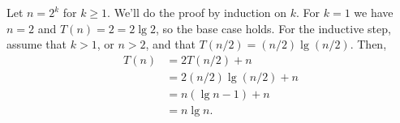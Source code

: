 Let $n=2^k$ for $k\ge1$.
We'll do the proof by induction on $k$.
For $k=1$ we have $n=2$ and $T(n)=2=2\lg2$, so the base case holds.
For the inductive step, assume that $k>1$, or $n>2$, and that $T(n/2)=(n/2)\lg(n/2)$.
Then,
\begin{align*}
    T(n) &= 2T(n/2)+n \\
    &= 2(n/2)\lg(n/2)+n \\
    &= n(\lg n-1)+n \\
    &= n\lg n.
\end{align*}
